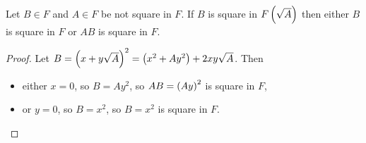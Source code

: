 \pagebreak


\begin{lemma}
\label{lem:biquadratic}
Let $ B \in F $ and $ A \in F $ be not square in $ F $. If $ B $ is square in $ F\br{\sqrt{A}} $ then either $ B $ is square in $ F $ or $ AB $ is square in $ F $.
\end{lemma}

\begin{proof}
Let $ B = \br{x + y\sqrt{A}}^2 = \br{x^2 + Ay^2} + 2xy\sqrt{A} $. Then
\begin{itemize}
\item either $ x = 0 $, so $ B = Ay^2 $, so $ AB = \br{Ay}^2 $ is square in $ F $,
\item or $ y = 0 $, so $ B = x^2 $, so $ B = x^2 $ is square in $ F $.
\end{itemize}
\end{proof}


